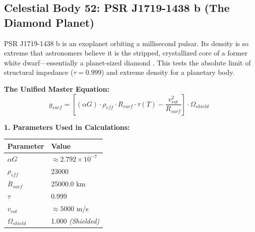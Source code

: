 \documentclass[11pt, a4paper]{article}
\begin{document}
\clearpage
\subsection{Celestial Body 52: PSR J1719-1438 b (The Diamond Planet)}
  PSR J1719-1438 b is an exoplanet orbiting a millisecond pulsar. Its density is so extreme that astronomers believe it is the stripped, crystallized core of a former white dwarf---essentially a planet-sized diamond \cite{bailes2011}. This tests the absolute limit of structural impedance ($\tau = 0.999$) and extreme density for a planetary body.

  \vspace{0.5em}
  \noindent \textbf{The Unified Master Equation:}
  $$ g_{surf} = \left[ (\alpha G) \cdot \rho_{eff} \cdot R_{surf} \cdot \tau(T) - \frac{v_{rot}^2}{R_{surf}} \right] \cdot \Omega_{shield} $$

  \vspace{0.5em}
  \noindent \textbf{1. Parameters Used in Calculations:} \\[0.5em]
  \begingroup
  \renewcommand{\arraystretch}{1.3}
  \hspace*{2em}
  \begin{tabular}{|l|l|}
    \hline
    \textbf{Parameter} & \textbf{Value} \\ \hline
    $\alpha G$ & $\approx 2.792 \times 10^{-7}$ \\ \hline
    $\rho_{eff}$ & 23000 \\ \hline
    $R_{surf}$ & 25000.0 km \\ \hline
    $\tau$ & 0.999 \\ \hline
    $v_{rot}$ & $\approx 5000$ m/s \\ \hline
    $\Omega_{shield}$ & 1.000 \textit{(Shielded)} \\ \hline
  \end{tabular}
  \endgroup
\end{document}
